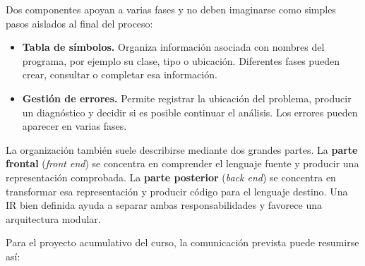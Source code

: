 \documentclass[11pt,spanish]{article}
\begin{document}
Dos componentes apoyan a varias fases y no deben imaginarse como simples pasos aislados al final del proceso:

\begin{itemize}
    \item \textbf{Tabla de símbolos.} Organiza información asociada con nombres del programa, por ejemplo su clase, tipo o ubicación. Diferentes fases pueden crear, consultar o completar esa información.
    \item \textbf{Gestión de errores.} Permite registrar la ubicación del problema, producir un diagnóstico y decidir si es posible continuar el análisis. Los errores pueden aparecer en varias fases.
\end{itemize}

La organización también suele describirse mediante dos grandes partes. La \textbf{parte frontal} (\emph{front end}) se concentra en comprender el lenguaje fuente y producir una representación comprobada. La \textbf{parte posterior} (\emph{back end}) se concentra en transformar esa representación y producir código para el lenguaje destino. Una IR bien definida ayuda a separar ambas responsabilidades y favorece una arquitectura modular.

Para el proyecto acumulativo del curso, la comunicación prevista puede resumirse así:
\end{document}
